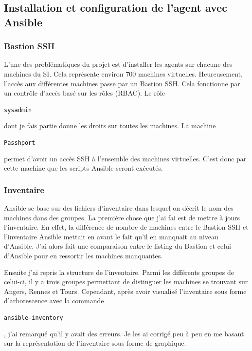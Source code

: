 \documentclass[12pt, a4paper, twoside]{article}
\begin{document}
\newpage
\subsection{Installation et configuration de l'agent avec Ansible}
\subsubsection{Bastion SSH}
L'une des problématiques du projet est d'installer les agents sur chacune des machines du \gls{SI}. 
Cela représente environ 700 machines virtuelles. 
Heureusement, l'accès aux différentes machines passe par un Bastion SSH. 
Cela fonctionne par un contrôle d'accès basé sur les rôles (\gls{RBAC}). 
Le rôle\begin{code}\texttt{sysadmin}\end{code} dont je fais partie donne les droits sur toutes les machines. 
La machine \begin{code}\texttt{Passhport}\end{code} permet d'avoir un accès SSH à l'ensemble des machines virtuelles.
C'est donc par cette machine que les scripts \gls{Ansible} seront exécutés.

\subsubsection{Inventaire}
\gls{Ansible} se base sur des fichiers d'inventaire dans lesquel on décrit le nom des machines dans des groupes. 
La première chose que j'ai fai est de mettre à jours l'inventaire. 
En effet, la différence de nombre de machines entre le Bastion SSH et l'inventaire \gls{Ansible} mettait en avant le fait qu'il en manquait au niveau d'\gls{Ansible}. 
J'ai alors fait une comparaison entre le listing du Bastion et celui d'\gls{Ansible} pour en ressortir les machines manquantes.

Ensuite j'ai repris la structure de l'inventaire. 
Parmi les différents groupes de celui-ci, il y a trois groupes permettant de distinguer les machines se trouvant sur Angers, Rennes et Tours. 
Cependant, après avoir visualisé l'inventaire sous forme d'arborescence avec la commande \begin{code}\texttt{ansible-inventory}\end{code}, j'ai remarqué qu'il y avait des erreurs. 
Je les ai corrigé peu à peu en me basant sur la représentation de l'inventaire sous forme de graphique.
\end{document}
